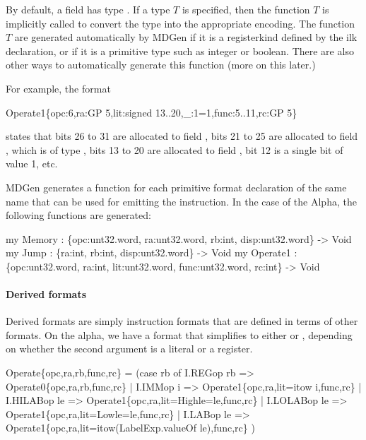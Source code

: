   By default, a field has type .  If a type $T$ 
is specified, then the function $T$ is implicitly called
to convert the type into the appropriate encoding.   The function 
$T$ are generated automatically by MDGen if it is a registerkind
defined by the  ilk declaration, or if it is a primitive
type such as integer or boolean.  
There are also other ways to automatically generate this function
(more on this later.)

  For example, the format 
\begin{SML}
   Operate1\{opc:6,ra:GP 5,lit:signed 13..20,_:1=1,func:5..11,rc:GP 5\} 
\end{SML}
states that bits 26 to 31 are allocated to field , 
bits 21 to 25 are allocated to field , which is of type 
, bits 13 to 20 are allocated to field , bit 12
is a single bit of value 1, etc.


MDGen generates a function for each primitive format declaration of
the same name that can be used for emitting the instruction.  
In the case of the Alpha, the following functions are generated:
\begin{SML}
   my Memory : \{opc:unt32.word, ra:unt32.word, 
                 rb:int, disp:unt32.word\} -> Void
   my Jump   : \{ra:int, rb:int, disp:unt32.word\} -> Void
   my Operate1 : \{opc:unt32.word, ra:int, lit:unt32.word,
                   func:unt32.word, rc:int\} -> Void
\end{SML}

\paragraph{Derived formats}

   Derived formats are simply instruction formats that are defined
in terms of other formats.  On the alpha, we have a 
format that simplifies to either  or ,
depending on whether the second argument is a literal or a register.  
\begin{SML}
   Operate\{opc,ra,rb,func,rc\} =
     (case rb of
       I.REGop rb => Operate0\{opc,ra,rb,func,rc\}
     | I.IMMop i  => Operate1\{opc,ra,lit=itow i,func,rc\}
     | I.HILABop le => Operate1\{opc,ra,lit=High{le=le},func,rc\}
     | I.LOLABop le => Operate1\{opc,ra,lit=Low{le=le},func,rc\}
     | I.LABop le => Operate1\{opc,ra,lit=itow(LabelExp.valueOf le),func,rc\}
     )
\end{SML}

